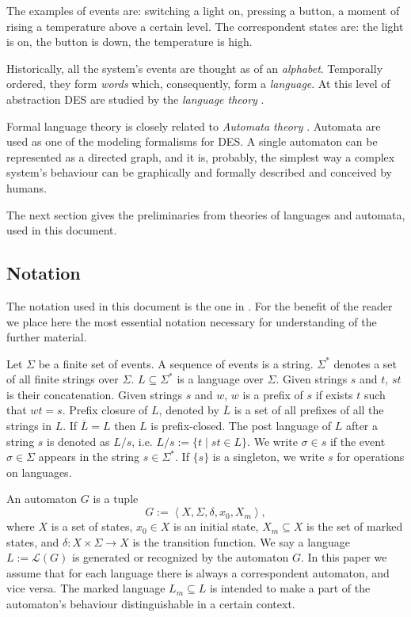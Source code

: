 The examples of events are: switching a light on, pressing a button, a 
moment of rising a temperature above a certain level. The correspondent states
are: the light is on, the button is down, the temperature is high.

Historically, all the system's events are thought as of an \emph{alphabet}.
Temporally ordered, they form \emph{words} which, consequently, form a
\emph{language}. At this level of abstraction DES are studied by the
\emph{language theory} \cite{aho_theory_1968}.

Formal language theory is closely related to \emph{Automata theory}
\cite{hopcroft_introduction_2007}. Automata are used as one of the modeling
formalisms for DES. A single automaton can be represented as a directed graph,
and it is, probably, the simplest way a complex system's behaviour can be graphically
and formally described and conceived by humans.

The next section gives the preliminaries from theories of languages and
automata, used in this document.


\subsection{Notation}

The notation used in this document is the one in
\cite{cassandras_introduction_2010}. For the benefit of the reader we place here
the most essential notation necessary for understanding of the further material.

Let $\Sigma$ be a finite set of events. A sequence of events is a string.
$\Sigma^*$ denotes a set of all finite strings over $\Sigma$.
$L\subseteq\Sigma^*$ is a language over $\Sigma$. Given strings $s$ and $t$,
$st$ is their concatenation. Given strings $s$ and $w$, $w$ is a prefix of $s$
if exists $t$ such that $wt = s$. Prefix closure of $L$, denoted by
$\overline{L}$ is a set of all prefixes of all the strings in $L$.
If $\overline{L} = L$ then $L$ is prefix-closed. The post language of $L$ after
a string $s$ is denoted as $L/s$, i.e. $L/s := \{t\mid st \in L\}$. We
write $\sigma \in s$ if the event $\sigma \in \Sigma$ appears in the string $s
\in \Sigma^*$. If $\{s\}$ is a singleton, we write $s$ for operations on
languages.

An automaton $G$ is a tuple $$G := \left< X,\Sigma,\delta,x_0, X_m \right>,$$
where $X$ is a set of states, $x_0 \in X$ is an initial state, $X_m \subseteq X$
is the set of marked states, and $\delta: X \times \Sigma \rightarrow X$ is the
transition function.
We say a language $L := \mathcal{L}(G)$ is generated or recognized by the
automaton $G$. In this paper we assume that for each language there is always a
correspondent automaton, and vice versa. The marked language $L_m \subseteq L$
is intended to make a part of the automaton's behaviour distinguishable in a
certain context.

